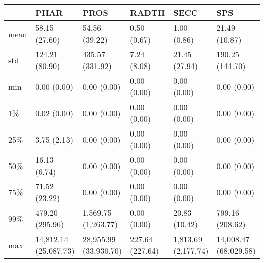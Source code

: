 \begin{tabular}{llllll}
\toprule
{} &                   PHAR &                   PROS &            RADTH &                 SECC &                    SPS \\
\midrule
mean &          58.15 (27.60) &          54.56 (39.22) &      0.50 (0.67) &          1.00 (0.86) &          21.49 (10.87) \\
std  &         124.21 (80.90) &        435.57 (331.92) &      7.24 (8.08) &        21.45 (27.94) &        190.25 (144.70) \\
min  &            0.00 (0.00) &            0.00 (0.00) &      0.00 (0.00) &          0.00 (0.00) &            0.00 (0.00) \\
1\%   &            0.02 (0.00) &            0.00 (0.00) &      0.00 (0.00) &          0.00 (0.00) &            0.00 (0.00) \\
25\%  &            3.75 (2.13) &            0.00 (0.00) &      0.00 (0.00) &          0.00 (0.00) &            0.00 (0.00) \\
50\%  &           16.13 (6.74) &            0.00 (0.00) &      0.00 (0.00) &          0.00 (0.00) &            0.00 (0.00) \\
75\%  &          71.52 (23.22) &            0.00 (0.00) &      0.00 (0.00) &          0.00 (0.00) &            0.00 (0.00) \\
99\%  &        479.20 (295.96) &    1,569.75 (1,263.77) &      0.00 (0.00) &        20.83 (10.42) &        799.16 (208.62) \\
max  &  14,812.14 (25,087.73) &  28,955.99 (33,930.70) &  227.64 (227.64) &  1,813.69 (2,177.74) &  14,008.47 (68,029.58) \\
\bottomrule
\end{tabular}
